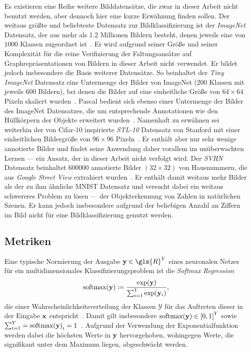 Es existieren eine Reihe weitere Bilddatensätze, die zwar in dieser Arbeit nicht benutzt werden, aber dennoch hier eine kurze Erwähnung finden sollen.
Der weitaus größte und beliebteste Datensatz zur Bildklassifizierung ist der \emph{ImageNet} Datensatz, der aus mehr als 1.2 Millionen Bildern besteht, denen jeweils eine von $1000$ Klassen zugeordnet ist~\cite{imagenet}.
Er wird aufgrund seiner Größe und seiner Komplexität für die reine Verifizierung der Faltungsansätze auf Graphrepräsentationen von Bildern in dieser Arbeit nicht verwendet.
Er bildet jedoch insbesondere die Basis weiterer Datensätze.
So beinhaltet \bspw{} der \emph{Tiny ImageNet} Datensatz eine Untermenge der Bilder von ImageNet (200 Klassen mit jeweils 600 Bildern), bei denen die Bilder auf eine einheitliche Größe von $64 \times 64$ Pixeln skaliert wurden~\cite{imagenet}.
\gls{Pascal} bedient sich ebenso einer Untermenge der Bilder des ImageNet Datensatzes, die um entsprechende Annotationen wie \zB{} den Hüllkörpern der Objekte erweitert wurden~\cite{pascal_voc}.
Namenhaft zu erwähnen sei weiterhin der von \gls{Cifar}-10 inspirierte \emph{STL-10} Datensatz von Stanford mit einer einheitlichen Bildergröße von $96 \times 96$ Pixeln~\cite{stl}.
Er enthält aber nur sehr wenige annotierte Bilder und findet seine Anwendung daher vorallem im unüberwachten Lernen — ein Ansatz, der in dieser Arbeit nicht verfolgt wird.
Der \emph{\gls{SVHN}} Datensatz beinhaltet 600000 annotierte Bilder $\left(32 \times 32\right)$ von Hausnummern, die aus \emph{Google Street View} extrahiert wurden~\cite{svhn}.
Er enthält damit weitaus mehr Bilder als der zu ihm ähnliche \gls{MNIST} Datensatz und versucht dabei ein weitaus schwereres Problem zu lösen — der Objekterkennung von Zahlen in natürlichen Szenen.
Er kann jedoch insbesondere aufgrund der beliebigen Anzahl an Ziffern im Bild nicht für eine Bildklassifizierung genutzt werden.

\subsection{Metriken}
\label{metriken}

Eine typische Normierung der Ausgabe $\ve{y} \in \gls{R}^Y$ eines neuronalen Netzes für ein multidimensionales Klassifizierungsproblem ist die \emph{Softmax Regression}
\begin{equation*}
  \mathrm{softmax}\left(\ve{y}\right) \coloneqq \frac{\exp\left(\ve{y}\right)}{\sum_{i=1}^Y \exp\left(\ve{y}_i\right)},
\end{equation*}
die einer Wahrscheinlichkeitsverteilung der Klassen $\mathcal{Y}$ für das Auftreten dieser in der Eingabe $\mathbf{x}$ entspricht~\cite{Nielsen, tensorflow}.
Damit gilt insbesondere $\mathrm{softmax}\left(\ve{y}\right) \in {\left[0, 1\right]}^Y$ sowie $\sum_{i=1}^Y = {\mathrm{softmax}\left(\ve{y}\right)}_i = 1$~\cite{Nielsen}.
Aufgrund der Verwendung der Exponentialfunktion werden dabei die höchsten Werte in $\mathbf{y}$ hervorgehoben, wohingegen Werte, die signifikant unter dem Maximum liegen, abgeschwächt werden.

